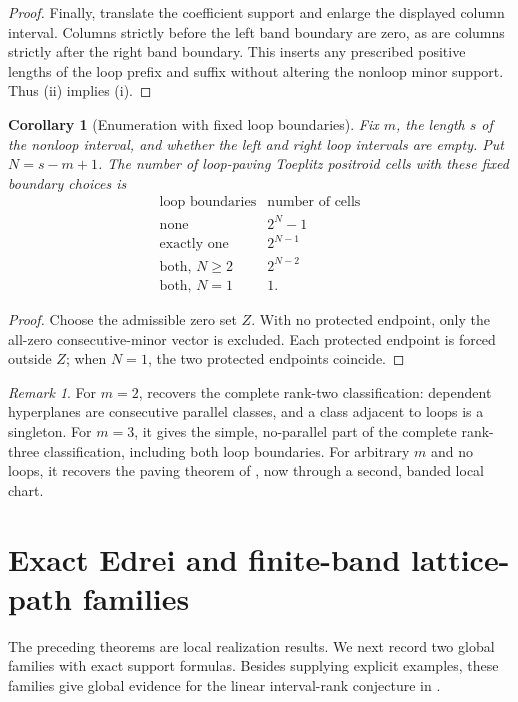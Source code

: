 \documentclass[11pt]{amsart}
\newtheorem{corollary}[theorem]{Corollary}
\theoremstyle{definition}
\theoremstyle{remark}
\newtheorem{remark}[theorem]{Remark}
\begin{document}
\begin{proof}
Finally, translate the coefficient support and enlarge the displayed column interval.  Columns strictly before the left band boundary are zero, as are columns strictly after the right band boundary.  This inserts any prescribed positive lengths of the loop prefix and suffix without altering the nonloop minor support.  Thus (ii) implies (i).
\end{proof}

\begin{corollary}[Enumeration with fixed loop boundaries]\label{cor:loop-paving-count}
Fix $m$, the length $s$ of the nonloop interval, and whether the left and right loop intervals are empty.  Put $N=s-m+1$.  The number of loop-paving Toeplitz positroid cells with these fixed boundary choices is
\[
 \begin{array}{c|c}
 \text{loop boundaries}&\text{number of cells}\\ \hline
 \text{none}&2^N-1\\
 \text{exactly one}&2^{N-1}\\
 \text{both, }N\ge2&2^{N-2}\\
 \text{both, }N=1&1.
 \end{array}
\]
\end{corollary}

\begin{proof}
Choose the admissible zero set $Z$.  With no protected endpoint, only the all-zero consecutive-minor vector is excluded.  Each protected endpoint is forced outside $Z$; when $N=1$, the two protected endpoints coincide.
\end{proof}

\begin{remark}
For $m=2$,  recovers the complete rank-two classification: dependent hyperplanes are consecutive parallel classes, and a class adjacent to loops is a singleton.  For $m=3$, it gives the simple, no-parallel part of the complete rank-three classification, including both loop boundaries.  For arbitrary $m$ and no loops, it recovers the paving theorem of \cite{CGQpaving}, now through a second, banded local chart.
\end{remark}

\section{Exact Edrei and finite-band lattice-path families}\label{sec:edrei}

The preceding theorems are local realization results.  We next record two global families with exact support formulas.  Besides supplying explicit examples, these families give global evidence for the linear interval-rank conjecture in .
\end{document}
